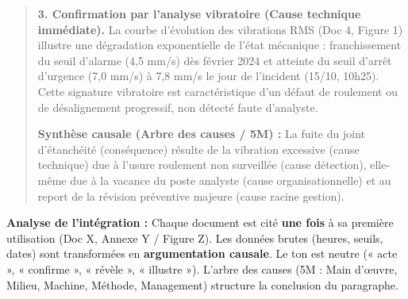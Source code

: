 \documentclass[11pt]{article}
\begin{document}
\begin{exoresolu}
\begin{quote}
        \textbf{3. Confirmation par l'analyse vibratoire (Cause technique immédiate).} La courbe d'évolution des vibrations RMS (Doc 4, Figure 1) illustre une dégradation exponentielle de l'état mécanique : franchissement du seuil d'alarme (4,5 mm/s) dès février 2024 et atteinte du seuil d'arrêt d'urgence (7,0 mm/s) à 7,8 mm/s le jour de l'incident (15/10, 10h25). Cette signature vibratoire est caractéristique d'un défaut de roulement ou de désalignement progressif, non détecté faute d'analyste.
        
        \textbf{Synthèse causale (Arbre des causes / 5M) :} La fuite du joint d'étanchéité (conséquence) résulte de la vibration excessive (cause technique) due à l'usure roulement non surveillée (cause détection), elle-même due à la vacance du poste analyste (cause organisationnelle) et au report de la révision préventive majeure (cause racine gestion).
    \end{quote}
    \textbf{Analyse de l'intégration :} Chaque document est cité \textbf{une fois} à sa première utilisation (Doc X, Annexe Y / Figure Z). Les données brutes (heures, seuils, dates) sont transformées en \textbf{argumentation causale}. Le ton est neutre (« acte », « confirme », « révèle », « illustre »). L'arbre des causes (5M : Main d'œuvre, Milieu, Machine, Méthode, Management) structure la conclusion du paragraphe.
\end{exoresolu}
\end{document}
